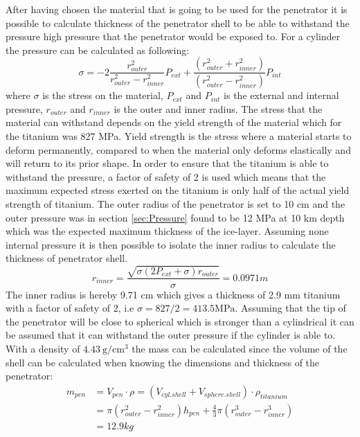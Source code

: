 After having chosen the material that is going to be used for the penetrator it is possible to calculate thickness of the penetrator shell to be able to withstand the pressure high pressure that the penetrator would be exposed to. For a cylinder the pressure can be calculated as following\cite{website:cylinderpressure}:  
\begin{equation}\label{eq:pressure}
\sigma = -2\frac{r_{outer}^2}{r_{outer}^2-r_{inner}^2}P_{ext} + \frac{(r_{outer}^2+r_{inner}^2)}{(r_{outer}^2-r_{inner}^2)}P_{int}
\end{equation}
where $\sigma$ is the stress on the material, $P_{ext}$ and $P_{int}$ is the external and internal pressure, $r_{outer}$ and $r_{inner}$ is the outer and inner radius. The stress that the material can withstand depends on the yield strength of the material which for the titanium was 827 MPa. Yield strength is the stress where a material starts to deform permanently, compared to when the material only deforms elastically and will return to its prior shape. In order to ensure that the titanium is able to withstand the pressure, a factor of safety of 2 is used which means that the maximum expected stress exerted on the titanium is only half of the actual yield strength of titanium. The outer radius of the penetrator is set to 10 cm and the outer pressure was in section \ref{sec:Pressure} found to be 12 MPa at 10 km depth which was the expected maximum thickness of the ice-layer. Assuming none internal pressure it is then possible to isolate the inner radius to calculate the thickness of penetrator shell. 
\begin{equation}
r_{inner} = \frac{\sqrt{\sigma(2P_{ext}+\sigma)r_{outer}}}{\sigma} = 0.0971 m
\end{equation}
The inner radius is hereby 9.71 cm which gives a thickness of 2.9 mm titanium with a factor of safety of 2, i.e $\sigma = 827/2 = 413.5 \text{MPa}$. Assuming that the tip of the penetrator will be close to spherical which is stronger than a cylindrical it can be assumed that it can withstand the outer pressure if the cylinder is able to. With a density of $\SI{4.43} {\gram\per\cubic\cm}$ the mass can be calculated since the volume of the shell can be calculated when knowing the dimensions and thickness of the penetrator: 
\begin{equation}
\begin{aligned}
m_{pen} & = V_{pen}\cdot \rho = \left(V_{cyl. shell}+V_{sphere. shell}\right) \cdot \rho_{titanium} \\
& = \pi(r_{outer}^2-r_{inner}^2)h_{pen} + \frac{4}{3}\pi(r_{outer}^3-r_{inner}^3)\\
& = 12.9 kg
\end{aligned}
\end{equation}
